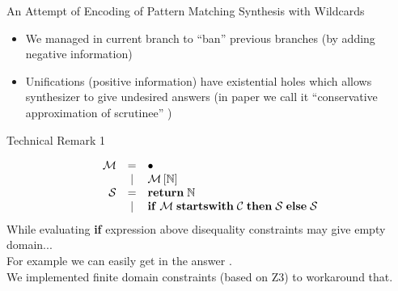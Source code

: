 \documentclass[aspectratio=169
  , xcolor={svgnames}
  , hyperref=
      { colorlinks
      , urlcolor=DarkBlue
      }
  , russian  %
  ]{beamer}
\begin{document}
\begin{frame}[fragile]{An Attempt of Encoding of Pattern Matching Synthesis with Wildcards }
\vspace{-1em}
\begin{figure}[t]
  \begin{subfigure}[ht]{.35\textwidth}
  \begin{minipage}{.1\textwidth}
\MarangetExample
  \end{minipage}
  \end{subfigure}
  \begin{subfigure}[t]{.49\textwidth}
  \begin{minipage}{.1\textwidth}
\PartialEnc
  \end{minipage}
  \end{subfigure}
\end{figure}
\begin{itemize}
\item [\faGood] We managed in current branch to ``ban'' previous branches (by adding negative information)
\item [\faBad] Unifications (positive information) have existential holes which allows synthesizer to give undesired answers (in paper we call it ``conservative approximation of scrutinee'' )
\end{itemize}
\end{frame}

\begin{frame}{Technical Remark 1}

\[
\begin{array}{rcl}
  \mathcal M & =        & \bullet \\
  &    \mid  & \mathcal M\,[\mathbb{N}] \\
  \mathcal{S}        & =        & \mathbf{return}\;\mathbb{N} \\
  &    \mid  & \mathbf{if}\;\mathcal{M}\;\mathbf{starts with}\;\mathcal{C}\;\mathbf{then}\; \mathcal{S}\;\mathbf{else}\;\mathcal{S}
\end{array}
\]
While evaluating \textbf{if} expression above disequality constraints may give empty domain...\\

For example we can easily get in the answer .\\

We implemented finite domain constraints (based on Z3) to workaround that.
\end{frame}
\end{document}
